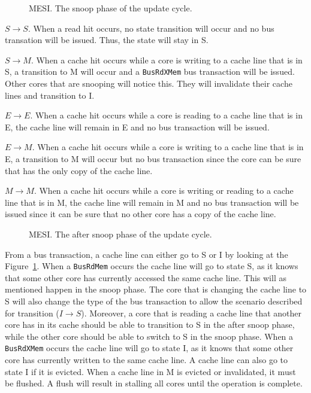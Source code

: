 \begin{figure}[H]
    \centering
    \caption{MESI. The snoop phase of the update cycle.}
    \label{fig:mesi_snoop}
\end{figure}

$S \to S$.
When a read hit occurs, no state transition will occur and no bus transation will be issued.
Thus, the state will stay in S.

$S \to M$.
When a cache hit occurs while a core is writing to a cache line that is in S, a transition to M will occur and a \texttt{BusRdXMem} bus transaction will be issued.
Other cores that are snooping will notice this.
They will invalidate their cache lines and transition to I.

$E \to E$.
When a cache hit occurs while a core is reading to a cache line that is in E, the cache line will remain in E and no bus transaction will be issued.

$E \to M$.
When a cache hit occurs while a core is writing to a cache line that is in E, a transition to M will occur but no bus transaction since the core can be sure that has the only copy of the cache line.

$M \to M$.
When a cache hit occurs while a core is writing or reading to a cache line that is in M, the cache line will remain in M and no bus transaction will be issued since it can be sure that no other core has a copy of the cache line.


\begin{figure}[H]
    \centering
    \caption{MESI. The after snoop phase of the update cycle.}
    \label{fig:mesi_after_snoop}
\end{figure}

From a bus transaction, a cache line can either go to S or I by looking at the Figure~\ref{fig:mesi_snoop}.
When a \texttt{BusRdMem} occurs the cache line will go to state S, as it knows that some other core has currently accessed the same cache line.
This will as mentioned happen in the snoop phase.
The core that is changing the cache line to S will also change the type of the bus transaction to allow the scenario described for transition ($I \to S$).
Moreover, a core that is reading a cache line that another core has in its cache should be able to transition to S in the after snoop phase, while the other core should be able to switch to S in the snoop phase.
When a \texttt{BusRdXMem} occurs the cache line will go to state I, as it knows that some other core has currently written to the same cache line.
A cache line can also go to state I if it is evicted.
When a cache line in M is evicted or invalidated, it must be flushed.
A flush will result in stalling all cores until the operation is complete.

